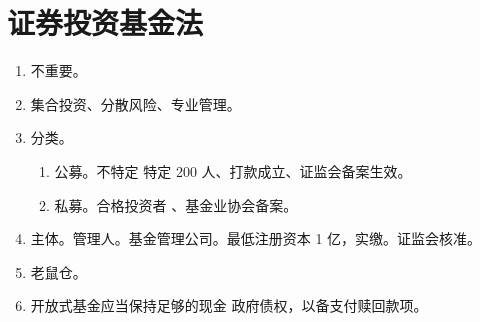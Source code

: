 \section{证券投资基金法}
\begin{enumerate}
  \item 不重要。
  \item 集合投资、分散风险、专业管理。
  \item 分类。
        \begin{enumerate}
          \item 公募。不特定 \hz 特定 200 人、打款成立、证监会备案生效。
          \item 私募。合格投资者 、基金业协会备案。
        \end{enumerate}
  \item 主体。管理人。基金管理公司。最低注册资本 1 亿，实缴。证监会核准。
  \item 老鼠仓。
  \item 开放式基金应当保持足够的现金 \hz 政府债权，以备支付赎回款项。
\end{enumerate}